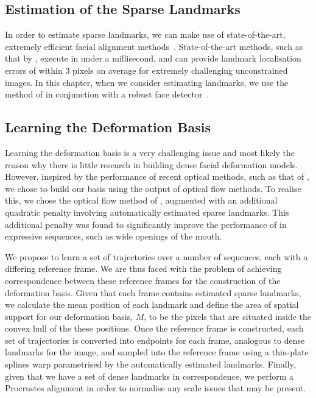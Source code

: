 \subsection{Estimation of the Sparse Landmarks}
In order to estimate sparse landmarks, we can make use of state-of-the-art, extremely
efficient facial alignment methods~\cite{kazemi2014one,asthana2014incremental,%
menpo14,alabort2014bayesian}.
State-of-the-art methods, such as that by \citet{kazemi2014one},
execute in under a millisecond, and can provide landmark localisation errors
of within $3$ pixels on average for extremely challenging unconstrained images.
In this chapter, when we consider estimating landmarks, we use the method of 
\citet{kazemi2014one} in conjunction with a robust face detector~\cite{zafeiriou2015survey}.
\subsection{Learning the Deformation Basis}\label{subsec:learning_deformation}
Learning the deformation basis is a very challenging issue and most likely the reason
why there is little research in building dense facial deformation models. However,
inspired by the performance of recent optical methods, such as that of \citet{garg2013variational},
we chose to build our basis using the output of optical flow methods. To realise this,
we chose the optical flow method of \citet{garg2013variational}, augmented with
an additional quadratic penalty involving automatically estimated sparse landmarks.
This additional penalty was found to significantly improve the performance of 
\cite{garg2013variational} in expressive sequences, such as wide openings of the mouth.

We propose to learn a set of trajectories over a number of sequences, each with
a differing reference frame. We are thus faced with the problem
of achieving correspondence between these reference frames for the construction
of the deformation basis. Given that each frame contains estimated sparse landmarks,
we calculate the mean position of each landmark and define the area of spatial support
for our deformation basis, $M$, to be the pixels that are situated inside the
convex hull of the these positions. Once the reference frame is constructed,
each set of trajectories is converted into endpoints for each frame, analogous
to dense landmarks for the image, and sampled into the reference frame using
a thin-plate splines warp parametrised by the automatically estimated landmarks.
Finally, given that we have a set of dense landmarks in correspondence, we perform a 
Procrustes alignment in order to normalise any scale issues that may be present.
